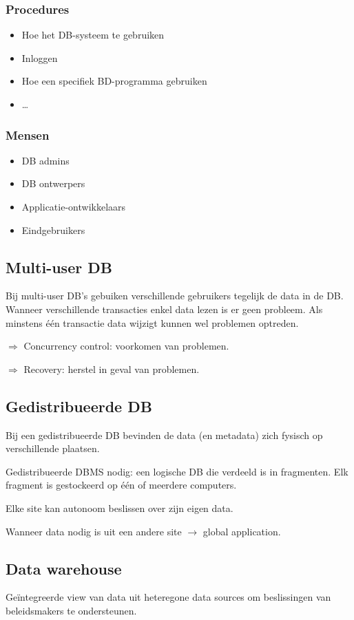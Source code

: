 \documentclass[a4paper,12pt]{article}
\begin{document}
\subsubsection{Procedures}
\begin{itemize}
\item Hoe het DB-systeem te gebruiken
\item Inloggen
\item Hoe een specifiek BD-programma gebruiken
\item \dots
\end{itemize}

\subsubsection{Mensen}
\begin{itemize}
\item DB admins
\item DB ontwerpers
\item Applicatie-ontwikkelaars
\item Eindgebruikers
\end{itemize}

\subsection{Multi-user DB}
Bij multi-user DB's gebuiken verschillende gebruikers tegelijk de data in de DB.
Wanneer verschillende transacties enkel data lezen is er geen probleem.
Als minstens één transactie data wijzigt kunnen wel problemen optreden.

$\Rightarrow$ Concurrency control: voorkomen van problemen.

$\Rightarrow$ Recovery: herstel in geval van problemen.

\subsection{Gedistribueerde DB}
Bij een gedistribueerde DB bevinden de data (en metadata) zich fysisch op  verschillende plaatsen.

Gedistribueerde DBMS nodig: een logische DB die verdeeld is in fragmenten.
Elk fragment is gestockeerd op één of meerdere computers.

Elke site kan autonoom beslissen over zijn eigen data.

Wanneer data nodig is uit een andere site $\rightarrow$ global application.

\subsection{Data warehouse}
Geïntegreerde view van data uit heteregone data sources om beslissingen van beleidsmakers te ondersteunen.
\end{document}
